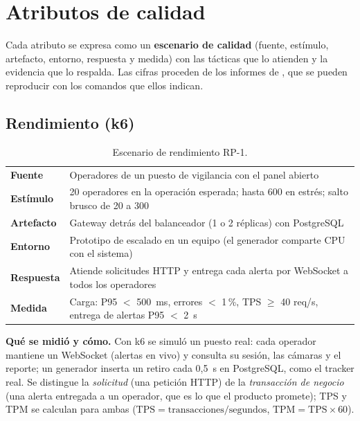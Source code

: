 \chapter{Atributos de calidad}

Cada atributo se expresa como un \textbf{escenario de calidad} (fuente, estímulo, artefacto, entorno, respuesta y medida) con las tácticas
que lo atienden \cite{bass} y la evidencia que lo respalda. Las cifras proceden de los informes de , que se pueden reproducir
con los comandos que ellos indican.

\section{Rendimiento (k6)}\label{sec:rendimiento}

\begin{table}[H]
\centering\small
\caption{Escenario de rendimiento RP-1.}\label{tab:rp1}
\begin{tabularx}{\textwidth}{lY}
\toprule
\textbf{Fuente} & Operadores de un puesto de vigilancia con el panel abierto \\
\textbf{Estímulo} & 20 operadores en la operación esperada; hasta 600 en estrés; salto brusco de 20 a 300 \\
\textbf{Artefacto} & Gateway detrás del balanceador (1 o 2 réplicas) con PostgreSQL \\
\textbf{Entorno} & Prototipo de escalado en un equipo (el generador comparte CPU con el sistema) \\
\textbf{Respuesta} & Atiende solicitudes HTTP y entrega cada alerta por WebSocket a todos los operadores \\
\textbf{Medida} & Carga: P95 $<$ 500~ms, errores $<$ 1\,\%, TPS $\geq$ 40 req/s, entrega de alertas P95 $<$ 2~s \\
\bottomrule
\end{tabularx}
\end{table}

\textbf{Qué se midió y cómo.} Con k6 se simuló un puesto real: cada operador mantiene un WebSocket (alertas en vivo) y consulta su sesión,
las cámaras y el reporte; un generador inserta un retiro cada 0,5~s en PostgreSQL, como el tracker real. Se distingue la
\emph{solicitud} (una petición HTTP) de la \emph{transacción de negocio} (una alerta entregada a un operador, que es lo que el producto
promete); TPS y TPM se calculan para ambas ($\mathrm{TPS}=\text{transacciones}/\text{segundos}$, $\mathrm{TPM}=\mathrm{TPS}\times 60$).

